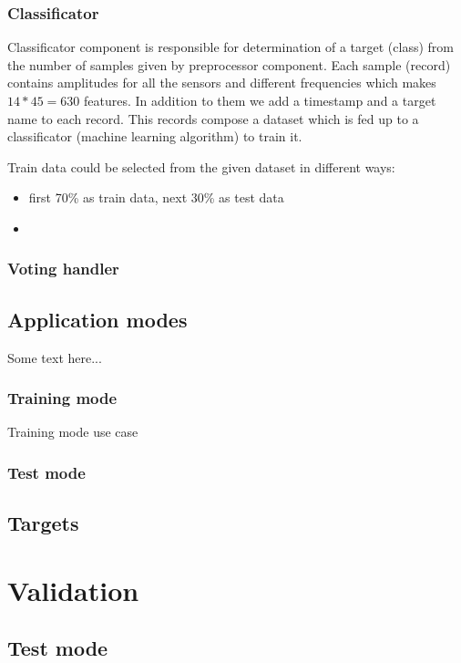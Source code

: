 \documentclass[12pt]{article}
\begin{document}
\subsubsection{Classificator}

Classificator component is responsible for determination of a target (class) from the number of samples given by preprocessor component. Each sample (record) contains amplitudes for all the sensors and different frequencies which makes $14*45=630$ features. In addition to them we add a timestamp and a target name to each record. This records compose a dataset which is fed up to a classificator (machine learning algorithm) to train it. 

Train data could be selected from the given dataset in different ways:

\begin{itemize}
\item first 70\% as train data, next 30\% as test data
\item 
\end{itemize}

\subsubsection{Voting handler}

\subsection{Application modes}
Some text here...
\subsubsection{Training mode}
Training mode use case
\subsubsection{Test mode}

\subsection{Targets}

\newpage
\section{Validation}

\subsection{Test mode}
\end{document}
